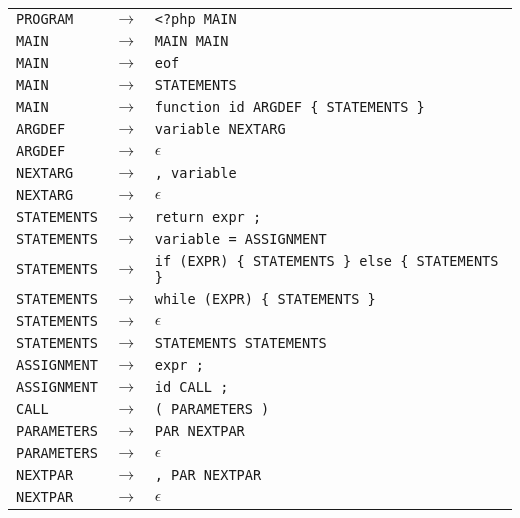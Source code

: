 \documentclass[12pt,a4paper,titlepage,final]{article}
\begin{document}
    \begin{tabular}{ l r l }

      \hline
      \texttt{PROGRAM} & $\rightarrow$ & \texttt{<?php MAIN} \\
      \texttt{MAIN} & $\rightarrow$ & \texttt{MAIN MAIN} \\
      \texttt{MAIN} & $\rightarrow$ & \texttt{eof} \\
      \texttt{MAIN} & $\rightarrow$ & \texttt{STATEMENTS} \\

      \hline
      \texttt{MAIN} & $\rightarrow$ &
        \texttt{function id ARGDEF \{ STATEMENTS \}} \\
      \texttt{ARGDEF} & $\rightarrow$ & \texttt{variable NEXTARG} \\
      \texttt{ARGDEF} & $\rightarrow$ & $\epsilon$ \\
      \texttt{NEXTARG} & $\rightarrow$ & \texttt{, variable} \\
      \texttt{NEXTARG} & $\rightarrow$ & $\epsilon$ \\

      \hline
      \texttt{STATEMENTS} & $\rightarrow$ & \texttt{return expr ;} \\
      \texttt{STATEMENTS} & $\rightarrow$ &
        \texttt{variable = ASSIGNMENT} \\
      \texttt{STATEMENTS} & $\rightarrow$ &
        \texttt{if (EXPR) \{ STATEMENTS \} else \{ STATEMENTS \}} \\
      \texttt{STATEMENTS} & $\rightarrow$ &
        \texttt{while (EXPR) \{ STATEMENTS \}} \\
      \texttt{STATEMENTS} & $\rightarrow$ & \texttt{$\epsilon$} \\
      \texttt{STATEMENTS} & $\rightarrow$ &
        \texttt{STATEMENTS STATEMENTS} \\

      \hline
      \texttt{ASSIGNMENT} & $\rightarrow$ & \texttt{expr ;} \\
      \texttt{ASSIGNMENT} & $\rightarrow$ & \texttt{id CALL ;} \\

      \hline
      \texttt{CALL} & $\rightarrow$ & \texttt{( PARAMETERS )} \\
      \texttt{PARAMETERS} & $\rightarrow$ & \texttt{PAR NEXTPAR} \\
      \texttt{PARAMETERS} & $\rightarrow$ & \texttt{$\epsilon$} \\
      \texttt{NEXTPAR} & $\rightarrow$ & \texttt{, PAR NEXTPAR} \\
      \texttt{NEXTPAR} & $\rightarrow$ & \texttt{$\epsilon$} \\


\end{tabular}
\end{document}
